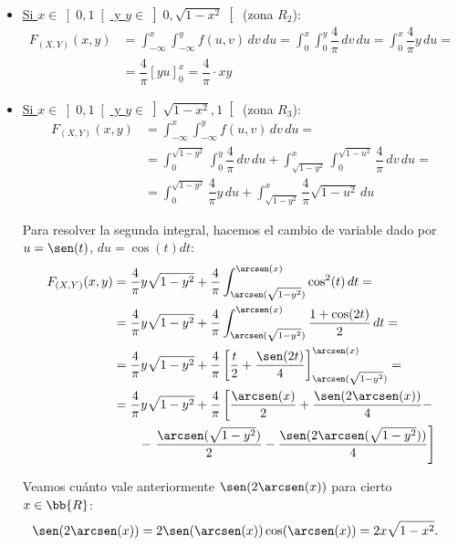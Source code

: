 \documentclass[12pt]{article}
\begin{document}
\begin{ejercicio}
\begin{enumerate}
\begin{itemize}
                \item \ul{Si $x\in \left]0,1\right[$ \quad y \quad $y\in \left]0,\sqrt{1-x^2}\right[$} (zona $R_2$):
                \begin{align*}
                    F_{(X,Y)}(x, y) &= \int_{-\infty}^x \int_{-\infty}^y f(u, v) \, dv \, du = \int_{0}^x \int_{0}^y \dfrac{4}{\pi} \, dv \, du = \int_{0}^x \dfrac{4}{\pi}y \, du
                    =\\&= \dfrac{4}{\pi}\left[yu\right]_0^x = \dfrac{4}{\pi}\cdot xy
                \end{align*}

                \item \ul{Si $x\in \left]0,1\right[$ \quad y \quad $y\in \left]\sqrt{1-x^2},1\right[$} (zona $R_3$):
                \begin{align*}
                    F_{(X,Y)}(x, y) &= \int_{-\infty}^x \int_{-\infty}^y f(u, v) \, dv \, du =\\&= \int_{0}^{\sqrt{1-y^2}}\int_0^y \dfrac{4}{\pi} \, dv \, du + \int_{\sqrt{1-y^2}}^x \int_0^{\sqrt{1-u^2}} \dfrac{4}{\pi} \, dv \, du =\\
                    &= \int_{0}^{\sqrt{1-y^2}} \dfrac{4}{\pi}y \, du + \int_{\sqrt{1-y^2}}^x \dfrac{4}{\pi}\sqrt{1-u^2} \, du
                \end{align*}

                Para resolver la segunda integral, hacemos el cambio de variable dado por $u=\sen(t)$, $du=\cos(t)dt$:
                \begin{align*}
                    F_{(X,Y)}(x, y) &= \dfrac{4}{\pi} y\sqrt{1-y^2} + \dfrac{4}{\pi}\int_{\arcsen(\sqrt{1-y^2})}^{\arcsen(x)} \cos^2(t) \, dt
                    =\\&= \dfrac{4}{\pi} y\sqrt{1-y^2} + \dfrac{4}{\pi}\int_{\arcsen(\sqrt{1-y^2})}^{\arcsen(x)} \dfrac{1+\cos(2t)}{2} \, dt
                    =\\&= \dfrac{4}{\pi} y\sqrt{1-y^2} + \dfrac{4}{\pi}\left[\dfrac{t}{2}+\dfrac{\sen(2t)}{4}\right]_{\arcsen(\sqrt{1-y^2})}^{\arcsen(x)}
                    =\\&= \dfrac{4}{\pi} y\sqrt{1-y^2} + \dfrac{4}{\pi}\left[\dfrac{\arcsen(x)}{2}+\dfrac{\sen(2\arcsen(x))}{4}-\right.\\&\qquad -\left.\dfrac{\arcsen(\sqrt{1-y^2})}{2}-\dfrac{\sen(2\arcsen(\sqrt{1-y^2}))}{4}\right]
                \end{align*}

                Veamos cuánto vale anteriormente $\sen(2\arcsen(x))$ para cierto $x\in \bb{R}$:
                \begin{align*}
                    \sen(2\arcsen(x)) &= 2\sen(\arcsen(x))\cos(\arcsen(x)) = 2x\sqrt{1-x^2}.
                \end{align*}


\end{itemize}
\end{enumerate}
\end{ejercicio}
\end{document}
